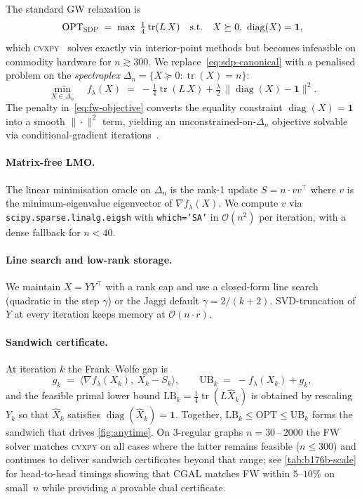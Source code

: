 \documentclass{article}
\theoremstyle{definition}
\theoremstyle{remark}
\newcommand{\FW}{\textsc{FW}\xspace}
\newcommand{\SDP}{\textsc{SDP}\xspace}
\newcommand{\GW}{\textsc{GW}\xspace}
\newcommand{\OPT}{\mathrm{OPT}}
\newcommand{\LB}{\mathrm{LB}}
\newcommand{\UB}{\mathrm{UB}}
\newcommand{\Oh}{\mathcal{O}}
\DeclareMathOperator{\tr}{tr}
\DeclareMathOperator{\diag}{diag}
\begin{document}
The standard \GW relaxation is
\begin{equation}
  \OPT_{\SDP}
  \;=\;
  \max\; \tfrac14 \tr(L\, X)
  \quad \text{s.t.} \quad X \succeq 0,\ \diag(X) = \bm{1},
  \label{eq:sdp-canonical}
\end{equation}
which \textsc{cvxpy}~\cite{diamond2016cvxpy} solves exactly via interior-point
methods but becomes infeasible on commodity hardware for $n \gtrsim 300$.
We replace~\eqref{eq:sdp-canonical} with a penalised problem on the
\emph{spectraplex} $\Delta_n = \{X \succeq 0 : \tr(X) = n\}$:
\begin{equation}
  \min_{X \in \Delta_n} \quad f_\lambda(X)
  \;=\;
  -\tfrac14 \tr(L\, X) + \tfrac{\lambda}{2}\,
   \bigl\| \diag(X) - \bm{1} \bigr\|^2.
  \label{eq:fw-objective}
\end{equation}
The penalty in~\eqref{eq:fw-objective} converts the equality constraint
$\diag(X) = \bm{1}$ into a smooth $\|\cdot\|^2$ term, yielding an
unconstrained-on-$\Delta_n$ objective solvable via conditional-gradient
iterations~\cite{jaggi2013revisiting,hazan2008sparse}.

\paragraph{Matrix-free LMO.} The linear minimisation oracle on
$\Delta_n$ is the rank-1 update $S = n \cdot v v^\top$ where $v$ is
the minimum-eigenvalue eigenvector of $\nabla f_\lambda(X)$. We compute
$v$ via \texttt{scipy.sparse.linalg.eigsh} with \texttt{which='SA'} in
$\Oh(n^2)$ per iteration, with a dense fallback for $n < 40$.

\paragraph{Line search and low-rank storage.} We maintain
$X = Y Y^\top$ with a rank cap and use a closed-form line search
(quadratic in the step $\gamma$) or the Jaggi default
$\gamma = 2/(k+2)$. SVD-truncation of $Y$ at every iteration keeps
memory at $\Oh(n \cdot r)$.

\paragraph{Sandwich certificate.} At iteration $k$ the Frank--Wolfe gap
is
\begin{equation}
  g_k \;=\; \langle \nabla f_\lambda(X_k),\ X_k - S_k \rangle,
  \qquad
  \UB_k \;=\; -f_\lambda(X_k) + g_k,
\end{equation}
and the feasible primal lower bound $\LB_k = \tfrac14 \tr(L \hat X_k)$
is obtained by rescaling $Y_k$ so that $\hat X_k$ satisfies
$\diag(\hat X_k) = \bm{1}$. Together, $\LB_k \le \OPT \le \UB_k$ forms
the sandwich that drives \cref{fig:anytime}. On $3$-regular
graphs $n = 30\,\text{--}\,2000$ the \FW solver matches \textsc{cvxpy}
on all cases where the latter remains feasible ($n \le 300$)
and continues to deliver sandwich certificates beyond that range;
see \cref{tab:b176b-scale} for head-to-head timings showing that CGAL
matches FW within $5$--$10\%$ on small~$n$ while providing a provable
dual certificate.
\end{document}
